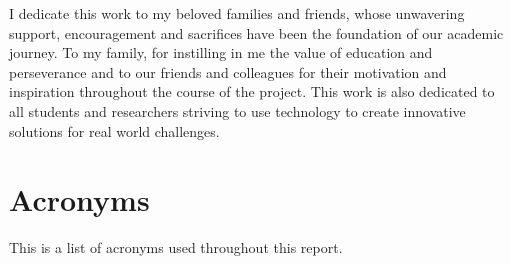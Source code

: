 \documentclass[12pt,a4paper,oneside]{report}
\begin{document}
I dedicate this work to my beloved families and friends, whose unwavering support, encouragement and sacrifices have been the foundation of our academic journey. To my family, for instilling in me the value of education and perseverance and to our friends and colleagues for their motivation and inspiration throughout the course of the project. This work is also dedicated to all students and researchers striving to use technology to create innovative solutions for real world challenges.

\clearpage
\chapter*{Acronyms}

This is a list of acronyms used throughout this report.
\end{document}
